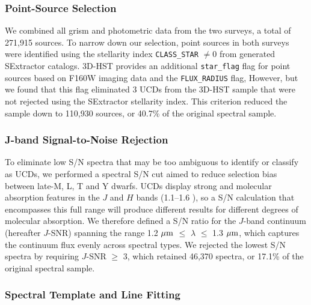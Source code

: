 \documentclass[manuscript]{aastex63}
\begin{document}
\subsubsection{Point-Source Selection}

We combined all grism and photometric data from the two surveys, a total of 271,915 sources.
To narrow down our selection, point sources in both surveys were identified using the stellarity index \texttt{CLASS\_STAR} $\neq$0 from generated SExtractor catalogs. 3D-HST provides an additional \texttt{star\_flag} flag for point sources based on F160W imaging data and the \texttt{FLUX\_RADIUS} flag, However, but we found that this flag eliminated 3 UCDs from the 3D-HST sample that were not rejected using the SExtractor stellarity index. This criterion reduced the sample down to 110,930 sources, or 40.7\% of the original spectral sample.

\subsubsection{J-band Signal-to-Noise Rejection}

To eliminate low S/N spectra that may be too ambiguous to identify or classify as UCDs, we performed a spectral S/N cut aimed to reduce selection bias between late-M, L, T and Y dwarfs. UCDs display strong \wat and \meth molecular absorption features in the $J$ and $H$ bands (1.1--1.6 \micron), so a S/N calculation that encompasses this full range will produce different results for different degrees of molecular absorption. We therefore defined a S/N ratio for the $J$-band continuum (hereafter $J$-SNR) spanning the range 1.2 $\mbox{$\mu$m}$ $\leq$ $\lambda$ $\leq$ 1.3 $\mbox{$\mu$m}$, which captures the continuum flux evenly across spectral types. We rejected the lowest S/N spectra by requiring $J$-SNR $\geq$ 3, which retained 46,370 spectra, or 17.1\% of the original spectral sample.

\subsubsection{Spectral Template and Line Fitting}
\end{document}
